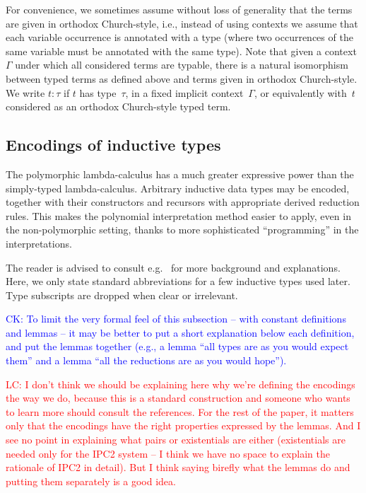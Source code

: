 \documentclass[a4paper,UKenglish,cleveref,autoref,numberwithinsect]{lipics-v2019}
\theoremstyle{definition}
\newcommand{\CK}[1]{\textcolor{blue}{CK: #1}}
\newcommand{\LC}[1]{\textcolor{red}{LC: #1}}
\begin{document}
For convenience, we sometimes assume without loss of generality that
the terms are given in orthodox Church-style, i.e., instead of using
contexts we assume that each variable occurrence is annotated with a
type (where two occurrences of the same variable must be annotated
with the same type). Note that given a context~$\Gamma$ under which
all considered terms are typable, there is a natural isomorphism
between typed terms as defined above and terms given in orthodox
Church-style. We write $t : \tau$ if $t$ has type~$\tau$, in a fixed
implicit context~$\Gamma$, or equivalently with~$t$ considered as an
orthodox Church-style typed term.

\subsection{Encodings of inductive types}\label{sec_encodings}

The polymorphic lambda-calculus has a much greater expressive power
than the simply-typed lambda-calculus. Arbitrary inductive data types
may be encoded, together with their constructors and recursors with
appropriate derived reduction rules. This makes the polynomial
interpretation method easier to apply, even in the non-polymorphic
setting, thanks to more sophisticated ``programming'' in the
interpretations.

The reader is advised to consult e.g.~\cite[Chapter~11]{Girard1989}
for more background and explanations. Here, we only state standard
abbreviations for a few inductive types used later. Type subscripts
are dropped when clear or irrelevant.

\CK{To limit the very formal feel of this subsection -- with constant
definitions and lemmas -- it may be better to put a short explanation
below each definition, and put the lemmas together (e.g., a lemma
``all types are as you would expect them'' and a lemma ``all the
reductions are as you would hope'').}

\LC{I don't think we should be explaining here why we're defining the
  encodings the way we do, because this is a standard construction and
  someone who wants to learn more should consult the references. For
  the rest of the paper, it matters only that the encodings have the
  right properties expressed by the lemmas. And I see no point in
  explaining what pairs or existentials are either (existentials are
  needed only for the IPC2 system -- I think we have no space to
  explain the rationale of IPC2 in detail). But I think saying birefly
  what the lemmas do and putting them separately is a good idea.}
\end{document}
